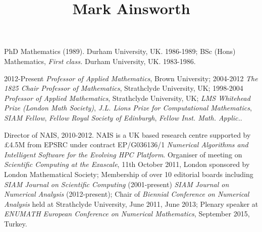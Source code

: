 \documentclass[11pt]{article}
\title{Mark Ainsworth}
\author{}
\date{}
\begin{document}
\maketitle

       PhD Mathematics (1989). Durham University, UK. 1986-1989;
       BSc (Hons) Mathematics, {\em First class.} Durham University,
       UK. 1983-1986.

     2012-Present \emph{Professor of Applied Mathematics}, Brown
         University;
     2004-2012 \emph{The 1825 Chair Professor of Mathematics},
         Strathclyde University, UK;
     1998-2004 \emph{Professor of Applied Mathematics}, Strathclyde
         University, UK;
	 \emph{LMS Whitehead Prize (London Math Society)},  
	 \emph{J.L. Lions Prize for Computational Mathematics},
	 \emph{SIAM Fellow},
	 \emph{Fellow Royal Society of Edinburgh},
	 \emph{Fellow Inst. Math. Applic.}.

  \nocite{Ainsworth+Andriamaro+etal:Bernstein-Bezier}
  \nocite{Ainsworth+Rankin:Guaranteed}
  \nocite{Ainsworth:synthesis}
  \nocite{Ainsworth+Oden:book}
  \nocite{Ainsworth+Rankin:Robust}
  \nocite{Ainsworth+Rankin:Quantities}
  \nocite{Ainsworth+Ma:Non-uniform}
  \nocite{Ainsworth+Vejchodsky:Fully}
  \nocite{Ainsworth+Senior:Aspects}
  \nocite{Ainsworth:framework}
  
  
        Director of NAIS, 2010-2012. NAIS is a UK based research
            centre supported by \pounds 4.5M from EPSRC under contract
            EP/G036136/1 {\em Numerical Algorithms and Intelligent Software
            for the Evolving HPC Platform}. 
        Organiser of meeting on {\em Scientific Computing at the
            Exascale}, 11th October 2011, London sponsored by London
            Mathematical Society;
        Membership of over 10 editorial boards including {\em SIAM Journal on Scientific
            Computing} (2001-present) {\em SIAM Journal on Numerical Analysis}
            (2012-present);
        Chair of {\em Biennial Conference on Numerical Analysis} held
            at Strathclyde University, June 2011, June 2013;
	Plenary speaker at {\em ENUMATH European Conference on Numerical Mathematics},
            September 2015, Turkey. 
\end{document}
